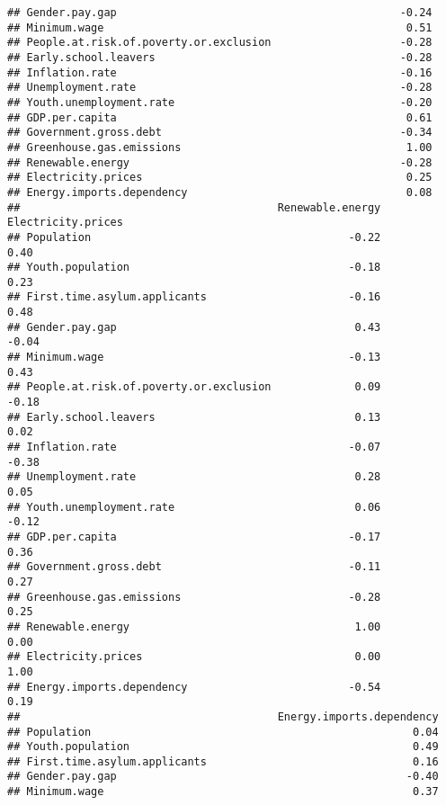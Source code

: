 \documentclass[
]{article}
\begin{document}
\begin{verbatim}
## Gender.pay.gap                                            -0.24
## Minimum.wage                                               0.51
## People.at.risk.of.poverty.or.exclusion                    -0.28
## Early.school.leavers                                      -0.28
## Inflation.rate                                            -0.16
## Unemployment.rate                                         -0.28
## Youth.unemployment.rate                                   -0.20
## GDP.per.capita                                             0.61
## Government.gross.debt                                     -0.34
## Greenhouse.gas.emissions                                   1.00
## Renewable.energy                                          -0.28
## Electricity.prices                                         0.25
## Energy.imports.dependency                                  0.08
##                                        Renewable.energy Electricity.prices
## Population                                        -0.22               0.40
## Youth.population                                  -0.18               0.23
## First.time.asylum.applicants                      -0.16               0.48
## Gender.pay.gap                                     0.43              -0.04
## Minimum.wage                                      -0.13               0.43
## People.at.risk.of.poverty.or.exclusion             0.09              -0.18
## Early.school.leavers                               0.13               0.02
## Inflation.rate                                    -0.07              -0.38
## Unemployment.rate                                  0.28               0.05
## Youth.unemployment.rate                            0.06              -0.12
## GDP.per.capita                                    -0.17               0.36
## Government.gross.debt                             -0.11               0.27
## Greenhouse.gas.emissions                          -0.28               0.25
## Renewable.energy                                   1.00               0.00
## Electricity.prices                                 0.00               1.00
## Energy.imports.dependency                         -0.54               0.19
##                                        Energy.imports.dependency
## Population                                                  0.04
## Youth.population                                            0.49
## First.time.asylum.applicants                                0.16
## Gender.pay.gap                                             -0.40
## Minimum.wage                                                0.37

\end{verbatim}
\end{document}
